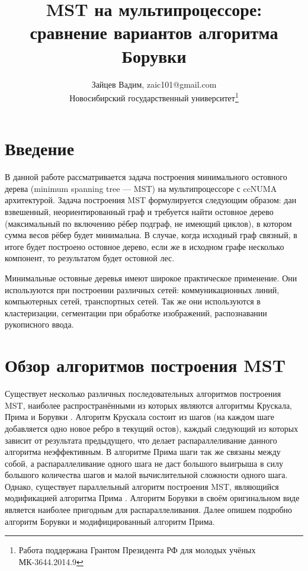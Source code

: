 \documentclass{article}
\date{}
\title{MST на мультипроцессоре: сравнение вариантов алгоритма Борувки}
\author{Зайцев Вадим, zaic101@gmail.com \\ Новосибирский государственный университет\thanks{Работа поддержана Грантом Президента РФ для молодых учёных МК-3644.2014.9}}
\begin{document}
\maketitle
\newpage




\newpage
\section{Введение}

В данной работе рассматривается задача построения минимального остовного дерева (minimum spanning tree --- MST) на мультипроцессоре с ccNUMA архитектурой.
Задача построения MST формулируется следующим образом: дан взвешенный, неориентированный граф и требуется найти остовное дерево (максимальный по включению рёбер подграф, не имеющий циклов), в котором сумма весов рёбер будет минимальна.
В случае, когда исходный граф связный, в итоге будет построено остовное дерево, если же в исходном графе несколько компонент, то результатом будет остовной лес.

Минимальные остовные деревья имеют широкое практическое применение.
Они используются при построении различных сетей: коммуникационных линий, компьютерных сетей, транспортных сетей.
Так же они используются в кластеризации, сегментации при обработке изображений, распознавании рукописного ввода.


\section{Обзор алгоритмов построения MST}
Существует несколько различных последовательных алгоритмов построения MST, наиболее распространёнными из которых являются алгоритмы Крускала, Прима и Борувки \cite{cormen}.
Алгоритм Крускала состоит из шагов (на каждом шаге добавляется одно новое ребро в текущий остов), каждый следующий из которых зависит от результата предыдущего, что делает распараллеливание данного алгоритма неэффективным.
В алгоритме Прима шаги так же связаны между собой, а распараллеливание одного шага не даст большого выигрыша в силу большого количества шагов и малой вычислительной сложности одного шага.
Однако, существует параллельный алгоритм построения MST, являющийся модификацией алгоритма Прима \cite{boruvka-prima}.
Алгоритм Борувки в своём оригинальном виде является наиболее пригодным для распараллеливания. 
Далее опишем подробно алгоритм Борувки и модифицированный алгоритм Прима.
\end{document}
